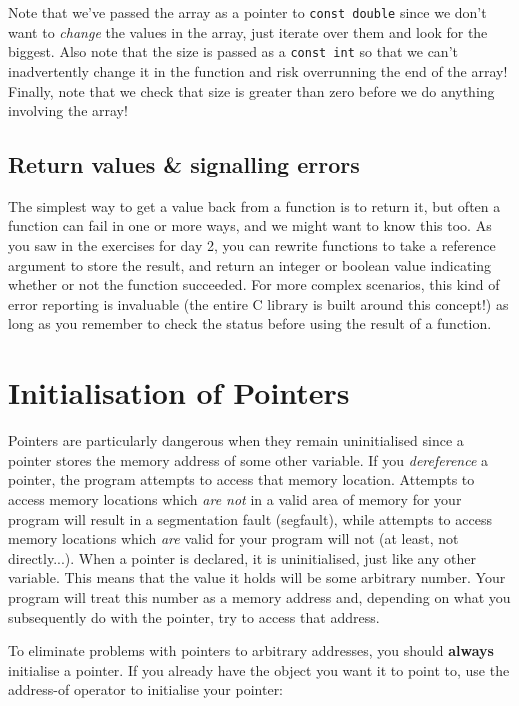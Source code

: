 \documentclass[a4paper]{scrartcl}
\begin{document}


Note that we've passed the array as a pointer to \verb|const double| since we don't want to \emph{change} the values in the array, just iterate over them and look for the biggest. Also note that the size is passed as a \verb|const int| so that we can't inadvertently change it in the function and risk overrunning the end of the array! Finally, note that we check that size is greater than zero before we do anything involving the array!

\subsection{Return values \& signalling errors}
The simplest way to get a value back from a function is to return it, but often a function can fail in one or more ways, and we might want to know this too. As you saw in the exercises for day 2, you can rewrite functions to take a reference argument to store the result, and return an integer or boolean value indicating whether or not the function succeeded. For more complex scenarios, this kind of error reporting is invaluable (the entire C library is built around this concept!) as long as you remember to check the status before using the result of a function.

\section{Initialisation of Pointers}
Pointers are particularly dangerous when they remain uninitialised since a pointer stores the memory address of some other variable. If you \emph{dereference} a pointer, the program attempts to access that memory location. Attempts to access memory locations which \emph{are not} in a valid area of memory for your program will result in a segmentation fault (segfault), while attempts to access memory locations which \emph{are} valid for your program will not (at least, not directly...). When a pointer is declared, it is uninitialised, just like any other variable. This means that the value it holds will be some arbitrary number. Your program will treat this number as a memory address and, depending on what you subsequently do with the pointer, try to access that address.

To eliminate problems with pointers to arbitrary addresses, you should \textbf{always} initialise a pointer. If you already have the object you want it to point to, use the address-of operator to initialise your pointer:
\end{document}
